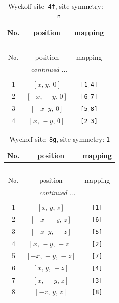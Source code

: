 \documentclass[fleqn,8pt]{jsarticle}
\begin{document}
\begin{longtable}{ccc}
\caption{Wyckoff site: {\tt 4f}, site symmetry: {\tt ..m}}
 \\
 \hline \hline
No. & position & mapping \\ \hline \endfirsthead

\multicolumn{2}{l}{\tablename\ \thetable{}} \\
 \hline \hline
No. & position & mapping \\ \hline \endhead

 \hline \hline
\multicolumn{2}{r}{\footnotesize\it continued ...} \\ \endfoot

 \hline \hline
\multicolumn{2}{r}{} \\ \endlastfoot

1 & $\left[ x,\, y,\, 0 \right]$ & {\tt [1,4]} \\ \hline
2 & $\left[ - x,\, - y,\, 0 \right]$ & {\tt [6,7]} \\ \hline
3 & $\left[ - x,\, y,\, 0 \right]$ & {\tt [5,8]} \\ \hline
4 & $\left[ x,\, - y,\, 0 \right]$ & {\tt [2,3]} \\
\end{longtable}
\renewcommand{\arraystretch}{1.2}
\begin{longtable}{ccc}
\caption{Wyckoff site: {\tt 8g}, site symmetry: {\tt 1}}
 \\
 \hline \hline
No. & position & mapping \\ \hline \endfirsthead

\multicolumn{2}{l}{\tablename\ \thetable{}} \\
 \hline \hline
No. & position & mapping \\ \hline \endhead

 \hline \hline
\multicolumn{2}{r}{\footnotesize\it continued ...} \\ \endfoot

 \hline \hline
\multicolumn{2}{r}{} \\ \endlastfoot

1 & $\left[ x,\, y,\, z \right]$ & {\tt [1]} \\ \hline
2 & $\left[ - x,\, - y,\, z \right]$ & {\tt [6]} \\ \hline
3 & $\left[ - x,\, y,\, - z \right]$ & {\tt [5]} \\ \hline
4 & $\left[ x,\, - y,\, - z \right]$ & {\tt [2]} \\ \hline
5 & $\left[ - x,\, - y,\, - z \right]$ & {\tt [7]} \\ \hline
6 & $\left[ x,\, y,\, - z \right]$ & {\tt [4]} \\ \hline
7 & $\left[ x,\, - y,\, z \right]$ & {\tt [3]} \\ \hline
8 & $\left[ - x,\, y,\, z \right]$ & {\tt [8]} \\
\end{longtable}
\end{document}
